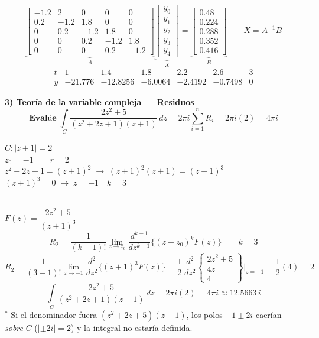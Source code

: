 \documentclass[11pt]{article}
\begin{document}
\[
\underbrace{\begin{bmatrix}
-1.2 & 2 & 0 & 0 & 0\\
0.2 & -1.2 & 1.8 & 0 & 0\\
0 & 0.2 & -1.2 & 1.8 & 0\\
0 & 0 & 0.2 & -1.2 & 1.8\\
0 & 0 & 0 & 0.2 & -1.2
\end{bmatrix}}_{A}
\underbrace{\begin{bmatrix} y_0\\ y_1\\ y_2\\ y_3\\ y_4\end{bmatrix}}_{X}
=
\underbrace{\begin{bmatrix} 0.48\\ 0.224\\ 0.288\\ 0.352\\ 0.416\end{bmatrix}}_{B}
\qquad X=A^{-1}B
\]
\[
\boxed{\begin{array}{c|cccccc}
t & 1 & 1.4 & 1.8 & 2.2 & 2.6 & 3\\\hline
y & -21.776 & -12.8256 & -6.0064 & -2.4192 & -0.7498 & 0
\end{array}}
\]

\newpage

{\large\textbf{3) Teoría de la variable compleja --- Residuos}}\\[6pt]
\[
\textbf{Evalúe}\;\int\limits_{C}\frac{2z^2+5}{(z^2+2z+1)(z+1)}\,dz=2\pi i\sum_{i=1}^{n}R_i=2\pi i(2)=4\pi i
\]
\begin{minipage}{0.55\textwidth}
$C: |z+1|=2$\\[6pt]
$z_0=-1 \qquad r=2$\\[6pt]
$z^2+2z+1=(z+1)^2 \;\to\; (z+1)^2(z+1)=(z+1)^3$\\[6pt]
$(z+1)^3=0 \;\to\; z=-1 \quad k=3$
\end{minipage}\hfill
\begin{minipage}{0.4\textwidth}
\end{minipage}\\[6pt]
$F(z)=\dfrac{2z^2+5}{(z+1)^3}$
\[
R_2=\frac{1}{(k-1)!}\lim_{z\to z_0}\frac{d^{k-1}}{dz^{k-1}}\{(z-z_0)^kF(z)\}\qquad k=3
\]
\[
R_2=\frac{1}{(3-1)!}\lim_{z\to-1}\frac{d^2}{dz^2}\{(z+1)^3F(z)\}
=\frac12\,\frac{d^2}{dz^2}\left\{\begin{matrix}2z^2+5\\ 4z\\ 4\end{matrix}\right\}\Bigg|_{z=-1}=\frac12(4)=2
\]
\[
\boxed{\int\limits_{C}\frac{2z^2+5}{(z^2+2z+1)(z+1)}\,dz=2\pi i(2)=4\pi i\approx 12.5663\,i}
\]
{\footnotesize $^{*}$ Si el denominador fuera $(z^2+2z+5)(z+1)$, los polos $-1\pm2i$ caerían \emph{sobre} $C$ ($|\pm2i|=2$) y la integral no estaría definida.}
\end{document}

